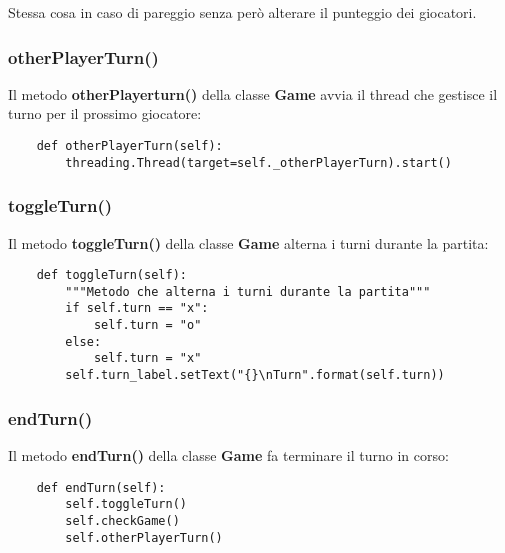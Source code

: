 \documentclass{article}
\begin{document}
Stessa cosa in caso di pareggio senza però alterare il punteggio dei giocatori.

\subsubsection{otherPlayerTurn()}
Il metodo \textbf{otherPlayerturn()} della classe \textbf{Game} avvia il thread che gestisce il turno per il prossimo giocatore:

\begin{verbatim}
    def otherPlayerTurn(self):
        threading.Thread(target=self._otherPlayerTurn).start()
\end{verbatim}
\newpage

\subsubsection{toggleTurn()}
Il metodo \textbf{toggleTurn()} della classe \textbf{Game} alterna i turni durante la partita:

\begin{verbatim}
    def toggleTurn(self):
        """Metodo che alterna i turni durante la partita"""
        if self.turn == "x":
            self.turn = "o"
        else:
            self.turn = "x"
        self.turn_label.setText("{}\nTurn".format(self.turn))
\end{verbatim}

\subsubsection{endTurn()}
Il metodo \textbf{endTurn()} della classe \textbf{Game} fa terminare il turno in corso:

\begin{verbatim}
    def endTurn(self):
        self.toggleTurn()
        self.checkGame()
        self.otherPlayerTurn()
\end{verbatim}
\end{document}
